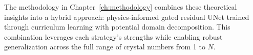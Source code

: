 The methodology in Chapter~\ref{ch:methodology} combines these theoretical insights into a hybrid approach: physics-informed gated residual UNet trained through curriculum learning with potential domain decomposition. This combination leverages each strategy's strengths while enabling robust generalization across the full range of crystal numbers from 1 to $N$.